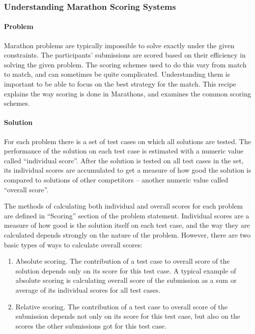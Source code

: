\documentclass[]{article}
\let\oldparagraph\paragraph
\renewcommand{\paragraph}[1]{\oldparagraph{#1}\mbox{}}
\begin{document}
\hypertarget{understanding-marathon-scoring-systems}{%
\subsubsection{Understanding Marathon Scoring
Systems}\label{understanding-marathon-scoring-systems}}

\hypertarget{problem-3}{%
\paragraph{Problem}\label{problem-3}}

Marathon problems are typically impossible to solve exactly under the
given constraints. The participants' submissions are scored based on
their efficiency in solving the given problem. The scoring schemes used
to do this vary from match to match, and can sometimes be quite
complicated. Understanding them is important to be able to focus on the
best strategy for the match. This recipe explains the way scoring is
done in Marathons, and examines the common scoring schemes.

\hypertarget{solution-3}{%
\paragraph{Solution}\label{solution-3}}

For each problem there is a set of test cases on which all solutions are
tested. The performance of the solution on each test case is estimated
with a numeric value called ``individual score''. After the solution is
tested on all test cases in the set, its individual scores are
accumulated to get a measure of how good the solution is compared to
solutions of other competitors -- another numeric value called ``overall
score''.

The methods of calculating both individual and overall scores for each
problem are defined in ``Scoring'' section of the problem statement.
Individual scores are a measure of how good is the solution itself on
each test case, and the way they are calculated depends strongly on the
nature of the problem. However, there are two basic types of ways to
calculate overall scores:

\begin{enumerate}
\def\labelenumi{\arabic{enumi}.}
\item
  Absolute scoring. The contribution of a test case to overall score of
  the solution depends only on its score for this test case. A typical
  example of absolute scoring is calculating overall score of the
  submission as a sum or average of its individual scores for all test
  cases.
\item
  Relative scoring. The contribution of a test case to overall score of
  the submission depends not only on its score for this test case, but
  also on the scores the other submissions got for this test case.
\end{enumerate}
\end{document}
